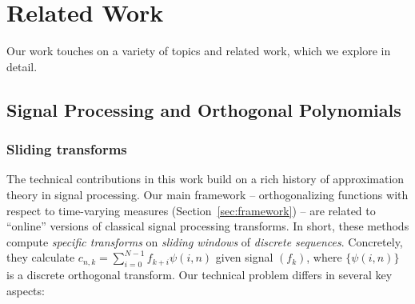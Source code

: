 \documentclass[../hippo.tex]{subfiles}
\begin{document}
\section{Related Work}
\label{sec:related-work}

Our work touches on a variety of topics and related work, which we explore in detail.

\subsection{Signal Processing and Orthogonal Polynomials}
\label{sec:rw-ops}

\subsubsection{Sliding transforms}
The technical contributions in this work build on a rich history of approximation theory in signal processing.
Our main framework -- orthogonalizing functions with respect to time-varying measures (Section~\ref{sec:framework}) -- are related to ``online'' versions of classical signal processing transforms.
In short, these methods compute \emph{specific transforms} on \emph{sliding windows} of \emph{discrete sequences}.
Concretely, they calculate $c_{n,k} = \sum_{i=0}^{N-1} f_{k+i} \psi(i, n)$ given signal $(f_k)$, where $\{\psi(i, n)\}$ is a discrete orthogonal transform.
Our technical problem differs in several key aspects:
\end{document}
